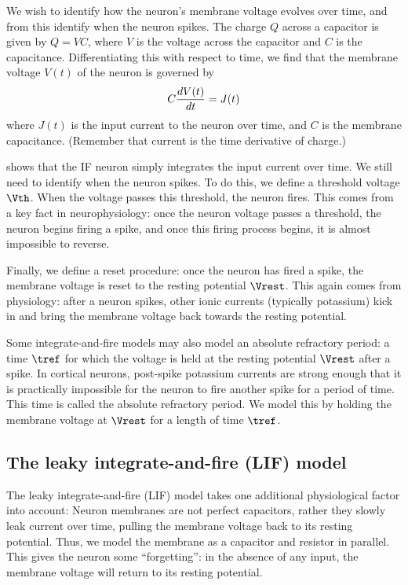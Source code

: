 We wish to identify how the neuron's membrane voltage evolves over time,
and from this identify when the neuron spikes.
The charge $Q$ across a capacitor is given by $Q = VC$,
where $V$ is the voltage across the capacitor and $C$ is the capacitance.
Differentiating this with respect to time,
we find that the membrane voltage $V(t)$ of the neuron is governed by
\begin{align}
  C \diff{V(t)}{t} = J(t)
  \eqnlabel{ifdiff}
\end{align}
where $J(t)$ is the input current to the neuron over time,
and $C$ is the membrane capacitance.
(Remember that current is the time derivative of charge.)

 shows that the IF neuron simply integrates
the input current over time.
We still need to identify when the neuron spikes.
To do this, we define a threshold voltage $\Vth$.
When the voltage passes this threshold, the neuron fires.
This comes from a key fact in neurophysiology:
once the neuron voltage passes a threshold,
the neuron begins firing a spike,
and once this firing process begins,
it is almost impossible to reverse.

Finally, we define a reset procedure:
once the neuron has fired a spike,
the membrane voltage is reset to the resting potential $\Vrest$.
This again comes from physiology:
after a neuron spikes,
other ionic currents (typically potassium)
kick in and bring the membrane voltage back towards the resting potential.

Some integrate-and-fire models may also model an absolute refractory period:
a time $\tref$ for which the voltage is held at the resting potential $\Vrest$
after a spike.
In cortical neurons, post-spike potassium currents are strong enough
that it is practically impossible for the neuron
to fire another spike for a period of time.
This time is called the absolute refractory period.
We model this by holding the membrane voltage at $\Vrest$
for a length of time $\tref$.


\subsection{The leaky integrate-and-fire (LIF) model}

The leaky integrate-and-fire (LIF) model \parencite{Lapicque1907,Knight1972,Koch1999}
takes one additional physiological factor into account:
Neuron membranes are not perfect capacitors,
rather they slowly leak current over time,
pulling the membrane voltage back to its resting potential.
Thus, we model the membrane as a capacitor and resistor in parallel.
This gives the neuron some ``forgetting'':
in the absence of any input, the membrane voltage will return to its
resting potential.

